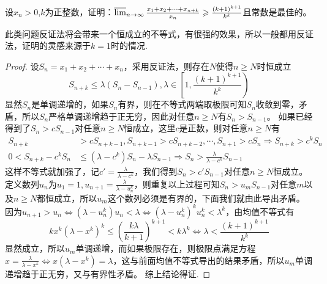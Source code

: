 \documentclass[../../main.tex]{subfiles}
\begin{document}
\begin{example}
设\(x_n>0\),\(k\)为正整数，证明：\(\varlimsup_{n\rightarrow\infty}\frac{x_1 + x_2+\cdots + x_{n + k}}{x_n}\geqslant \frac{(k + 1)^{k + 1}}{k^k}\)且常数是最佳的。
\end{example}
\begin{note}
此类问题反证法将会带来一个恒成立的不等式，有很强的效果，所以一般都用反证法，证明的灵感来源于\(k = 1\)时的情况.
\end{note}
\begin{proof}
设\(S_n=x_1 + x_2+\cdots + x_n\)，采用反证法，则存在\(N\)使得\(n\geqslant  N\)时恒成立
\[S_{n + k}\leqslant \lambda(S_n - S_{n - 1}),\lambda\in\left[1,\frac{(k + 1)^{k + 1}}{k^k}\right)\]
显然\(S_n\)是单调递增的，如果\(S_n\)有界，则在不等式两端取极限可知\(S_n\)收敛到零，矛盾，所以\(S_n\)严格单调递增趋于正无穷，因此对任意\(n\geqslant  N\)有\(S_n>S_{n - 1}\)。
如果已经得到了\(S_n>cS_{n - 1}\)对任意\(n\geqslant  N\)恒成立，这里\(c\)是正数，则对任意\(n\geqslant  N\)有
\begin{align*}
S_{n + k}&>cS_{n + k - 1},S_{n + k - 1}>cS_{n + k - 2},\cdots,S_{n + 1}>cS_n\Rightarrow S_{n + k}>c^kS_n\\
0<S_{n + k}-c^kS_n&\leqslant (\lambda - c^k)S_n-\lambda S_{n - 1}\Rightarrow S_n>\frac{\lambda}{\lambda - c^k}S_{n - 1}
\end{align*}
这样不等式就加强了，记\(c'=\frac{\lambda}{\lambda - c^k}\)，我们得到\(S_n>c'S_{n - 1}\)对任意\(n\geqslant  N\)恒成立。
定义数列\(u_n\)为\(u_1 = 1,u_{n + 1}=\frac{\lambda}{\lambda - u_n^k}\)，则重复以上过程可知\(S_n>u_mS_{n - 1}\)对任意\(m\)以及\(n\geqslant  N\)都恒成立，所以\(u_m\)这个数列必须是有界的，下面我们就由此导出矛盾。
因为\(u_{n + 1}>u_n\Leftrightarrow(\lambda - u_n^k)u_n<\lambda\Leftrightarrow(\lambda - u_n^k)^ku_n^k<\lambda^k\)，由均值不等式有
\[kx^k(\lambda - x^k)^k\leqslant \left(\frac{k\lambda}{k + 1}\right)^{k + 1}<k\lambda^k\Leftrightarrow\lambda<\frac{(k + 1)^{k + 1}}{k^k}\]
显然成立，所以\(u_m\)单调递增，而如果极限存在，则极限点满足方程\(x=\frac{\lambda}{\lambda - x^k}\Leftrightarrow x(\lambda - x^k)=\lambda\)，这与前面均值不等式导出的结果矛盾，所以\(u_m\)单调递增趋于正无穷，又与有界性矛盾。
综上结论得证.

\end{proof}
\end{document}
